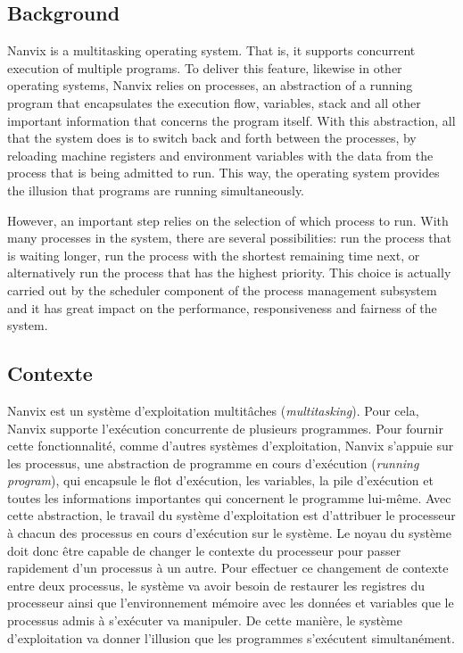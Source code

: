 \documentclass[11pt]{article}
\newif\iffr
\begin{document}
	\subsection*{Background}

	Nanvix is a multitasking operating system. That is, it supports
	concurrent execution of multiple programs. To deliver this feature,
	likewise in other operating systems, Nanvix relies on processes, an
	abstraction of a running program that encapsulates the execution
	flow, variables, stack and all other important information that
	concerns the program itself. With this abstraction, all that the
	system does is to switch back and forth between the processes, by
	reloading machine registers and environment variables with the data from
	the process that is being admitted to run. This way, the
	operating system provides the illusion that programs are running
	simultaneously.

	 However, an important step relies on the selection of which process
	 to run. With many processes in the system, there are several
	 possibilities: run the process that is waiting longer, run the
	 process with the shortest remaining time next, or alternatively run
	 the process that has the highest priority. This choice is actually
	 carried out by the scheduler component of the process management
	 subsystem and it has great impact on the performance,
	 responsiveness and fairness of the system.
\else\iffr
	\subsection*{Contexte}

		Nanvix est un système d'exploitation multitâches ({\em multitasking}).
		Pour cela, Nanvix supporte l'exécution concurrente de plusieurs
		programmes. Pour fournir cette fonctionnalité, comme d'autres systèmes
		d'exploitation, Nanvix s'appuie sur les processus, une abstraction de
		programme en cours d'exécution ({\em running program}), qui encapsule
		le flot d'exécution, les variables, la pile d'exécution et toutes les
		informations importantes qui concernent le programme lui-même. Avec
		cette abstraction, le travail du système d'exploitation est
		d'attribuer le processeur à chacun des processus en cours d'exécution
		sur le système. Le noyau du système doit donc être capable de changer
		le contexte du processeur pour passer rapidement d'un processus à un
		autre.  Pour effectuer ce changement de contexte entre deux processus,
		le système va avoir besoin de restaurer les registres du processeur
		ainsi que l'environnement mémoire avec les données et variables que le
		processus admis à s'exécuter va manipuler. De cette manière, le
		système d'exploitation va donner l'illusion que les programmes
		s'exécutent simultanément.
\end{document}
